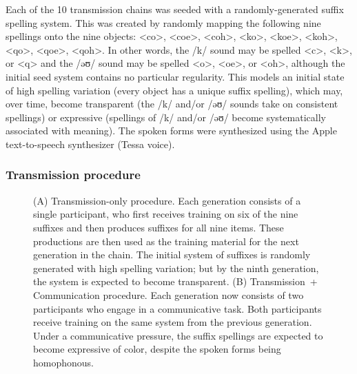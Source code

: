 \documentclass[doc,biblatex]{apa7}
\begin{document}
Each of the 10 transmission chains was seeded with a randomly-generated suffix spelling system. This was created by randomly mapping the following nine spellings onto the nine objects: <co>, <coe>, <coh>, <ko>, <koe>, <koh>, <qo>, <qoe>, <qoh>. In other words, the /k/ sound may be spelled <c>, <k>, or <q> and the /əʊ/ sound may be spelled <o>, <oe>, or <oh>, although the initial seed system contains no particular regularity. This models an initial state of high spelling variation (every object has a unique suffix spelling), which may, over time, become transparent (the /k/ and/or /əʊ/ sounds take on consistent spellings) or expressive (spellings of /k/ and/or /əʊ/ become systematically associated with meaning). The spoken forms were synthesized using the Apple text-to-speech synthesizer (Tessa voice).

\subsubsection{Transmission procedure}

	\begin{figure}
	\vspace*{2pt}
	\caption{(A) Transmission-only procedure. Each generation consists of a single participant, who first receives training on six of the nine suffixes and then produces suffixes for all nine items. These productions are then used as the training material for the next generation in the chain. The initial system of suffixes is randomly generated with high spelling variation; but by the ninth generation, the system is expected to become transparent. (B) Transmission~+ Communication procedure. Each generation now consists of two participants who engage in a communicative task. Both participants receive training on the same system from the previous generation. Under a communicative pressure, the suffix spellings are expected to become expressive of color, despite the spoken forms being homophonous.}
	\label{transmission}
	\end{figure}
\end{document}
